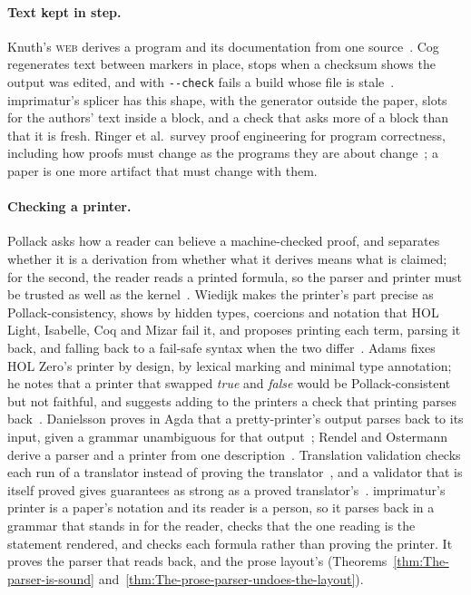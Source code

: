 \documentclass[acmsmall,screen,review,anonymous,nonacm]{acmart}
\begin{document}
\paragraph{Text kept in step.} Knuth's \textsc{web} derives a program and
its documentation from one source~\cite{Knuth84}. Cog regenerates text
between markers in place, stops when a checksum shows the output was
edited, and with \verb|--check| fails a build whose file is
stale~\cite{Batchelder25}. imprimatur's splicer has this shape, with the
generator outside the paper, slots for the authors' text inside a block,
and a check that asks more of a block than that it is fresh. Ringer et al.\ survey proof
engineering for program correctness, including how proofs must change as
the programs they are about change~\cite{Ringer19}; a paper is one more
artifact that must change with them.

\paragraph{Checking a printer.} Pollack asks how a reader can believe a
machine-checked proof, and separates whether it is a derivation from
whether what it derives means what is claimed; for the second, the reader
reads a printed formula, so the parser and printer must be trusted as well
as the kernel~\cite{Pollack98}. Wiedijk makes the printer's part precise as
Pollack-consistency, shows by hidden types, coercions and notation that
HOL Light, Isabelle, Coq and Mizar fail it, and proposes printing each
term, parsing it back, and falling back to a fail-safe syntax when the two
differ~\cite{Wiedijk12}. Adams fixes HOL Zero's printer by design, by
lexical marking and minimal type annotation; he notes that a printer that
swapped \emph{true} and \emph{false} would be Pollack-consistent but not
faithful, and suggests adding to the printers a check that printing parses
back~\cite{Adams16}. Danielsson proves in Agda that a pretty-printer's
output parses back to its input, given a grammar unambiguous for that
output~\cite{Danielsson13}; Rendel and Ostermann derive a parser and a
printer from one description~\cite{Rendel10}. Translation validation
checks each run of a translator instead of proving the
translator~\cite{Pnueli98,Necula00}, and a validator that is itself proved
gives guarantees as strong as a proved translator's~\cite{Tristan08}.
imprimatur's printer is a paper's notation and its reader is a person, so
it parses back in a grammar that stands in for the reader, checks that the
one reading is the statement rendered, and checks each formula rather
than proving the printer. It proves the parser that reads back, and the prose layout's
(Theorems~\ref{thm:The-parser-is-sound}
and~\ref{thm:The-prose-parser-undoes-the-layout}).
\end{document}
